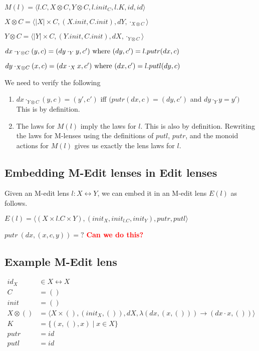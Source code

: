 \documentclass[a4paper,10pt]{article}
\newcommand{\finish}[1]{#1}
\newcommand{\comment}[1]{\finish{\textbf{\textcolor{red}{#1}}}}
\begin{document}
$M(l) = \langle l.C, X \otimes C, Y \otimes C, l.init_C, l.K, id, id \rangle$

$X \otimes C = \langle |X| \times C, (X.init, C.init), dY, \cdot_{X \otimes C} \rangle$

$Y \otimes C = \langle |Y| \times C, (Y.init, C.init), dX, \cdot_{Y \otimes C} \rangle$

$ dx \cdot_{Y \otimes C} (y,c) = (dy \cdot_Y y, c') \textnormal{ where } (dy, c') = l.putr (dx, c)$

$ dy \cdot_{X \otimes C} (x,c) = (dx \cdot_X x, c') \textnormal{ where } (dx, c') = l.putl (dy, c)$

We need to verify the following
\begin{enumerate}
 \item $dx \cdot_{Y \otimes C} (y,c) = (y', c')$ iff $(putr (dx, c) = (dy, c')$ and $dy \cdot_Y y = y')$\\
       This is by definition.
 \item The laws for $M(l)$ imply the laws for $l$.
       This is also by definition. Rewriting the laws for M-lenses using the definitions of $putl$, $putr$, and the monoid actions for $M(l)$ gives us exactly the lens laws for $l$.
\end{enumerate}

\subsection{Embedding M-Edit lenses in Edit lenses}
Given an M-edit lens $l:X \leftrightarrow Y$, we can embed it in an M-edit lens $E(l)$ as follows. 

$E(l) = \langle (X \times l.C \times Y), (init_X, init_{l.C}, init_Y), putr, putl \rangle $

$putr~(dx, (x,c,y)) = ?$ \comment{Can we do this?}


\subsection{Example M-Edit lens}
  \begin{align*}
    id_X &\in X \leftrightarrow X \\
    C &= () \\
    init &= () \\
    X \otimes () &= \langle X \times (), (init_X, ()), dX, \lambda (dx,(x,())) \to (dx \cdot x, ()) \rangle \\
    K &= \{ (x, (), x) \mid x \in X \} \\
    putr &= id \\
    putl &= id
  \end{align*}
  
\end{document}
